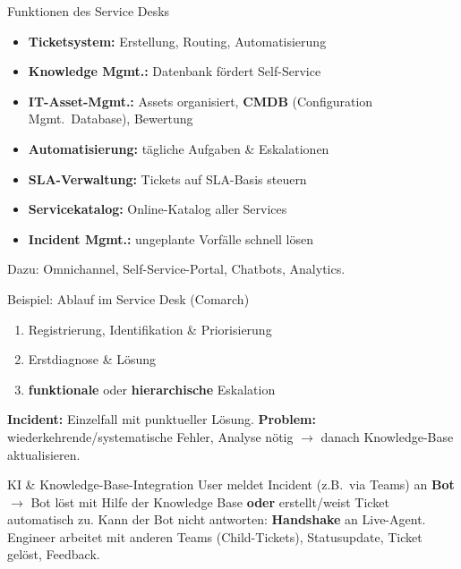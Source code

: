 \documentclass[a4paper, fontsize=7pt]{scrartcl}
\begin{document}
\begin{mainbox}{Funktionen des Service Desks}
\begin{itemize}
    \item \textbf{Ticketsystem:} Erstellung, Routing, Automatisierung
    \item \textbf{Knowledge Mgmt.:} Datenbank fördert Self-Service
    \item \textbf{IT-Asset-Mgmt.:} Assets organisiert, \textbf{CMDB}
          (Configuration Mgmt.\ Database), Bewertung
    \item \textbf{Automatisierung:} tägliche Aufgaben \& Eskalationen
    \item \textbf{SLA-Verwaltung:} Tickets auf SLA-Basis steuern
    \item \textbf{Servicekatalog:} Online-Katalog aller Services
    \item \textbf{Incident Mgmt.:} ungeplante Vorfälle schnell lösen
\end{itemize}
Dazu: Omnichannel, Self-Service-Portal, Chatbots, Analytics.
\end{mainbox}

\begin{subbox}{Beispiel: Ablauf im Service Desk (Comarch)}
\begin{enumerate}
    \item Registrierung, Identifikation \& Priorisierung
    \item Erstdiagnose \& Lösung
    \item \textbf{funktionale} oder \textbf{hierarchische} Eskalation
\end{enumerate}
\textbf{Incident:} Einzelfall mit punktueller Lösung.
\textbf{Problem:} wiederkehrende/systematische Fehler, Analyse nötig
$\to$ danach Knowledge-Base aktualisieren.
\end{subbox}

\begin{subbox}{KI \& Knowledge-Base-Integration}
User meldet Incident (z.B.\ via Teams) an \textbf{Bot} $\to$ Bot löst mit Hilfe
der Knowledge Base \textbf{oder} erstellt/weist Ticket automatisch zu. Kann der
Bot nicht antworten: \textbf{Handshake} an Live-Agent. Engineer
arbeitet mit anderen Teams (Child-Tickets), Statusupdate, Ticket gelöst, Feedback.
\end{subbox}
\end{document}
